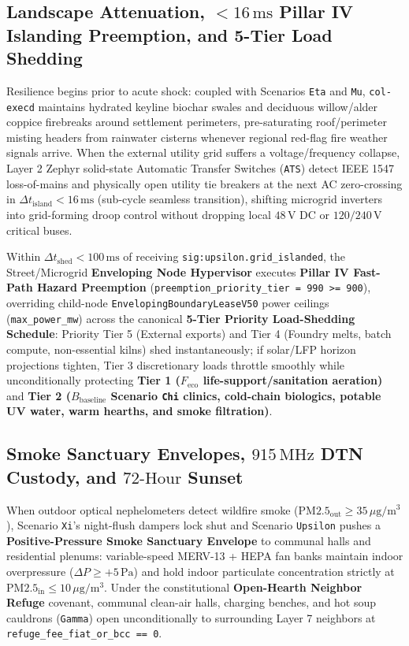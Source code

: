 \subsection{Landscape Attenuation, $<16\,\mathrm{ms}$ Pillar IV Islanding Preemption, and 5-Tier Load Shedding}

Resilience begins prior to acute shock: coupled with Scenarios \texttt{Eta} and \texttt{Mu}, \texttt{col-execd} maintains hydrated keyline biochar
swales and deciduous willow/alder coppice firebreaks around settlement perimeters, pre-saturating roof/perimeter misting headers from rainwater cisterns
whenever regional red-flag fire weather signals arrive. When the external utility grid suffers a voltage/frequency collapse, Layer 2 Zephyr solid-state
Automatic Transfer Switches (\texttt{ATS}) detect IEEE 1547 loss-of-mains and physically open utility tie breakers at the next AC zero-crossing in
$\Delta t_{\mathrm{island}} < 16\,\mathrm{ms}$ (sub-cycle seamless transition), shifting microgrid inverters into grid-forming droop control without
dropping local $48\,\mathrm{V}$ DC or $120/240\,\mathrm{V}$ critical buses.

Within $\Delta t_{\mathrm{shed}} < 100\,\mathrm{ms}$ of receiving \texttt{sig:upsilon.grid\_islanded}, the Street/Microgrid \textbf{Enveloping Node
Hypervisor} executes \textbf{Pillar IV Fast-Path Hazard Preemption} (\texttt{preemption\_priority\_tier = 990 >= 900}), overriding child-node
\texttt{EnvelopingBoundaryLeaseV50} power ceilings (\texttt{max\_power\_mw}) across the canonical \textbf{5-Tier Priority Load-Shedding Schedule}:
Priority Tier 5 (External exports) and Tier 4 (Foundry melts, batch compute, non-essential kilns) shed instantaneously; if solar/LFP horizon
projections tighten, Tier 3 discretionary loads throttle smoothly while unconditionally protecting \textbf{Tier 1 ($F_{\mathrm{eco}}$
life-support/sanitation aeration)} and \textbf{Tier 2 ($B_{\mathrm{baseline}}$ Scenario \texttt{Chi} clinics, cold-chain biologics, potable UV water,
warm hearths, and smoke filtration)}.

\subsection{Smoke Sanctuary Envelopes, $915\,\mathrm{MHz}$ DTN Custody, and $72\text{-Hour}$ Sunset}

When outdoor optical nephelometers detect wildfire smoke ($\mathrm{PM2.5}_{\mathrm{out}} \ge 35\,\mu\mathrm{g/m^3}$), Scenario \texttt{Xi}'s night-flush
dampers lock shut and Scenario \texttt{Upsilon} pushes a \textbf{Positive-Pressure Smoke Sanctuary Envelope} to communal halls and residential plenums:
variable-speed MERV-13 + HEPA fan banks maintain indoor overpressure ($\Delta P \ge +5\,\mathrm{Pa}$) and hold indoor particulate concentration strictly
at $\mathrm{PM2.5}_{\mathrm{in}} \le 10\,\mu\mathrm{g/m^3}$. Under the constitutional \textbf{Open-Hearth Neighbor Refuge} covenant, communal clean-air
halls, charging benches, and hot soup cauldrons (\texttt{Gamma}) open unconditionally to surrounding Layer 7 neighbors at
\texttt{refuge\_fee\_fiat\_or\_bcc == 0}.


